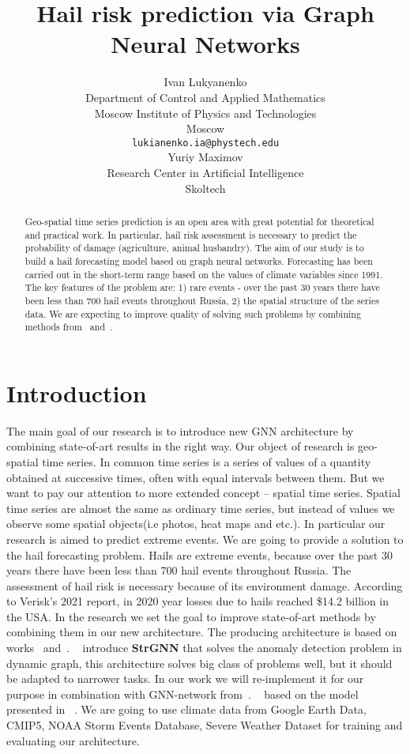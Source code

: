 \documentclass{article}
\title{Hail risk prediction via Graph Neural Networks}
\author{ Ivan Lukyanenko \\
	Department of Control and Applied Mathematics\\
	Moscow Institute of Physics and Technologies\\
	Moscow \\
	\texttt{lukianenko.ia@phystech.edu} \\
	\And
	Yuriy Maximov \\
	Research Center in Artificial Intelligence\\
	Skoltech\\
}
\date{}
\begin{document}
\maketitle

\begin{abstract}
	Geo-spatial time series prediction is an open area with great potential for theoretical and practical work. In particular, hail risk assessment is necessary to predict the probability of damage (agriculture, animal husbandry). The aim of our study is to build a hail forecasting model based on graph neural networks. Forecasting has been carried out in the short-term range based on the values of climate variables since 1991. The key features of the problem are: 1) rare events - over the past 30 years there have been less than 700 hail events throughout Russia, 2) the spatial structure of the series data. We are expecting to improve quality of solving such problems by combining methods from~\cite{DBLP:journals/corr/abs-2012-01598} and~\cite{DBLP:journals/corr/abs-2005-07427}.
\end{abstract}



\section{Introduction}
The main goal of our research is to introduce new GNN architecture by combining state-of-art results in the right way. Our object of research is geo-spatial time series. In common time series is a series of values of a quantity obtained at successive times, often with equal intervals between them. But we want to pay our attention to more extended concept -- spatial time series. Spatial time series are almost the same as ordinary time series, but instead of values we observe some spatial objects(i.e photos, heat maps and etc.). In particular our research is aimed to predict extreme events. We are going to provide a solution to the hail forecasting problem. Hails are extreme events, because over the past 30 years there have been less than 700 hail events throughout Russia. The assessment of hail risk is necessary because of its environment damage. According to Verisk’s 2021 report, in 2020 year losses due to hails reached \$14.2 billion in the USA.
In the research we set the goal to improve state-of-art methods by combining them in our new architecture. The producing architecture is based on works~\cite{DBLP:journals/corr/abs-2012-01598} and~\cite{DBLP:journals/corr/abs-2005-07427}. ~\cite{DBLP:journals/corr/abs-2005-07427} introduce \textbf{StrGNN} that solves the anomaly detection problem in dynamic graph, this architecture solves big class of problems well, but it should be adapted to narrower tasks. In our work we will re-implement it for our purpose in combination with GNN-network from~\cite{DBLP:journals/corr/abs-2012-01598}. ~\cite{DBLP:journals/corr/abs-2012-01598} based on the model presented in ~\cite{wu2020connecting}. We are going to use climate data from Google Earth Data, CMIP5, NOAA Storm Events Database, Severe Weather Dataset for training and evaluating our architecture.
\end{document}

